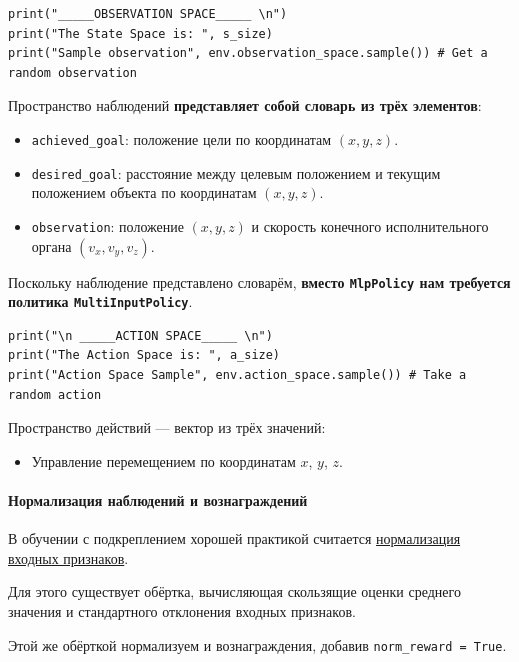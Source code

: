 \documentclass[11pt,a4paper]{article}
\begin{document}
\begin{lstlisting}
print("_____OBSERVATION SPACE_____ \n")
print("The State Space is: ", s_size)
print("Sample observation", env.observation_space.sample()) # Get a random observation
\end{lstlisting}

Пространство наблюдений \textbf{представляет собой словарь из трёх элементов}:

\begin{itemize}
\tightlist
\item
  \texttt{achieved\_goal}: положение цели по координатам \((x,y,z)\).
\item
  \texttt{desired\_goal}: расстояние между целевым положением и текущим положением объекта по координатам \((x,y,z)\).
\item
  \texttt{observation}: положение \((x,y,z)\) и скорость конечного исполнительного органа \((v_x,v_y,v_z)\).
\end{itemize}

Поскольку наблюдение представлено словарём, \textbf{вместо \texttt{MlpPolicy} нам требуется политика \texttt{MultiInputPolicy}}.

\begin{lstlisting}
print("\n _____ACTION SPACE_____ \n")
print("The Action Space is: ", a_size)
print("Action Space Sample", env.action_space.sample()) # Take a random action
\end{lstlisting}

Пространство действий --- вектор из трёх значений:

\begin{itemize}
\tightlist
\item
  Управление перемещением по координатам \(x\), \(y\), \(z\).
\end{itemize}

\paragraph{Нормализация наблюдений и вознаграждений}\label{normalize-observation-and-rewards}

В обучении с подкреплением хорошей практикой считается \href{https://stable-baselines3.readthedocs.io/en/master/guide/rl_tips.html}{нормализация входных признаков}.

Для этого существует обёртка, вычисляющая скользящие оценки среднего значения и стандартного отклонения входных признаков.

Этой же обёрткой нормализуем и вознаграждения, добавив \texttt{norm\_reward\ =\ True}.
\end{document}
